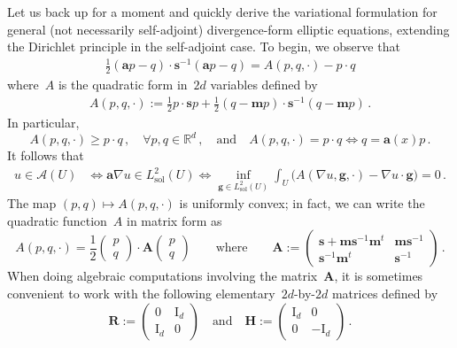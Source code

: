 \documentclass[11pt]{article} %
\numberwithin{equation}{section}
\theoremstyle{definition}
\newcommand*{\Id}{\ensuremath{\mathrm{I}_d}}
\newcommand*{\Rd}{\ensuremath{\mathbb{R}^d}}
\newcommand{\qand}{\quad \mbox{and} \quad }
\newcommand{\g}{\mathbf{g}}
\newcommand{\s}{\mathbf{s}}
\renewcommand{\a}{\mathbf{a}}
\newcommand{\m}{\mathbf{m}}
\newcommand{\A}{\mathcal{A}}
\newcommand{\Lsol}{L^2_{\mathrm{sol}}}
\newcommand{\bfA}{\mathbf{A}}
\newcommand{\rota}{\mathbf{R}}
\newcommand{\refl}{\mathbf{H}}
\begin{document}
\smallskip

Let us back up for a moment and quickly derive the variational formulation for general (not necessarily self-adjoint) divergence-form elliptic equations, extending the Dirichlet principle in the self-adjoint case. To begin, we observe that 
\begin{align*}
\frac12 (\a p - q) \cdot \s^{-1}  (\a p - q)
=
A(p,q,\cdot) - p\cdot q
\end{align*}
where~$A$ is the quadratic form in~$2d$ variables defined by
\begin{align}
\label{e.Apq.def}
A(p,q,\cdot) 
:=
\frac12 p\cdot \s p + \frac 12 (q-\m p) \cdot \s^{-1}(q-\m p)
\,.
\end{align}
In particular, 
\begin{equation}
\label{e.Apq.equality.iff}
A(p,q,\cdot) \geq p\cdot q\,,  \quad \forall p,q\in\Rd\,, 
\quad \mbox{and} \quad 
A(p,q,\cdot) = p\cdot q
\iff
q = \a(x) p \,.
\end{equation}
It follows that 
\begin{align}
\label{e.yesvar}
u\in \A(U) & \iff
\a\nabla u \in \Lsol(U)
\iff 
\inf_{\g \in \Lsol(U)}
\int_U 
\bigl( A(\nabla u,\g,\cdot) - \nabla u\cdot \g \bigr)
= 0
\,.
\end{align}
The map $(p,q) \mapsto A(p,q,\cdot)$ is uniformly convex; in fact, we can write the quadratic function~$A$ in matrix form as
\begin{equation}
\label{e.bfA.form}
A(p,q,\cdot) 
=
\frac12 \begin{pmatrix} p \\ q \end{pmatrix}
\cdot
\bfA
\begin{pmatrix} p \\ q \end{pmatrix}
\qquad \mbox{where} \qquad
\bfA := \begin{pmatrix} \s + \m\s^{-1}\m^t & \m\s^{-1} \\ \s^{-1}\m^t & \s^{-1} \end{pmatrix}
\,.
\end{equation}
When doing algebraic computations involving the matrix~$\bfA$, it is sometimes convenient to work with the following elementary~$2d$-by-$2d$ matrices defined by
\begin{equation}  \label{e.rotaandrefl}
\rota := \begin{pmatrix} 0 & \Id \\ \Id & 0 \end{pmatrix}
\qand
\refl := \begin{pmatrix} \Id & 0 \\ 0 & -\Id \end{pmatrix}
\,.
\end{equation}
\end{document}
